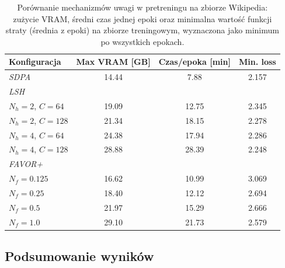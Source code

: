 \documentclass[a4paper,11pt,twoside]{report}
\theoremstyle{definition}
\begin{document}
\begin{table}[t!]
\centering
\caption{Porównanie mechanizmów uwagi w pretreningu na zbiorze Wikipedia: zużycie VRAM, średni czas jednej epoki oraz minimalna wartość funkcji straty (średnia z epoki) na zbiorze treningowym, wyznaczona jako minimum po wszystkich epokach.}
\smallskip
\label{tab:attention-metrics}
\small
\begin{tabular}{@{}lccc@{}}
\toprule
\textbf{Konfiguracja} & \textbf{Max VRAM [GB]} & \textbf{Czas/epoka [min]} & \textbf{Min. loss} \\
\midrule
\textit{SDPA} & 14.44 & 7.88 & 2.157 \\
\midrule
\multicolumn{4}{l}{\textit{LSH}} \\
$N_h{=}2$, $C{=}64$ & 19.09 & 12.75 & 2.345 \\
$N_h{=}2$, $C{=}128$ & 21.34 & 18.15 & 2.278 \\
$N_h{=}4$, $C{=}64$ & 24.38 & 17.94 & 2.286 \\
$N_h{=}4$, $C{=}128$ & 28.88 & 28.39 & 2.248 \\
\midrule
\multicolumn{4}{l}{\textit{FAVOR+}} \\
$N_f{=}0.125$ & 16.62 & 10.99 & 3.069 \\
$N_f{=}0.25$ & 18.40 & 12.12 & 2.694 \\
$N_f{=}0.5$ & 21.97 & 15.29 & 2.666 \\
$N_f{=}1.0$ & 29.10 & 21.73 & 2.579 \\
\bottomrule
\end{tabular}
\end{table}


\subsection{Podsumowanie wyników}
\end{document}
